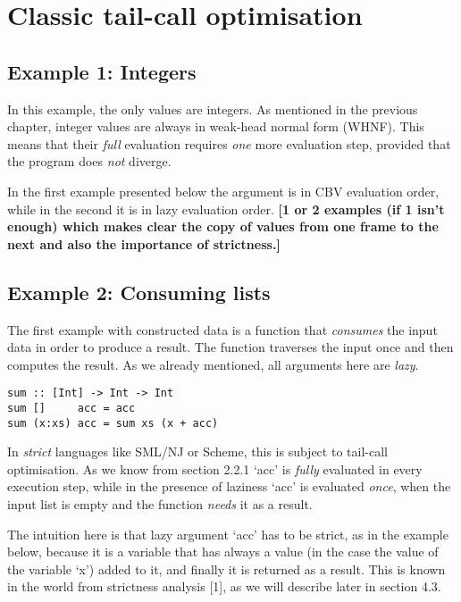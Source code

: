 \documentclass[diploma]{softlab-thesis}
\begin{document}
\section {Classic tail-call optimisation}

\subsection {Example 1: Integers}
In this example, the only values are integers. As mentioned 
in the previous chapter, integer values are always in weak-head normal 
form (WHNF). This means that their \textit{full} evaluation requires \textit{one} more evaluation
step, provided that the program does \textit{not} diverge. 


In the first example presented below the argument is in CBV evaluation order, 
while in the second it is in lazy evaluation order. \textbf{[1 or 2 examples (if 1 isn't enough) which makes clear the copy of values from 
one frame to the next and also the importance of strictness.]}


\subsection {Example 2: Consuming lists}

The first example with constructed data is a 
function that \textit{consumes} the input data in 
order to produce a result.  The function traverses 
the input once and then computes the result. As we 
already mentioned, all arguments here are \textit{lazy}.

\begin{verbatim}
sum :: [Int] -> Int -> Int
sum []     acc = acc
sum (x:xs) acc = sum xs (x + acc)
\end{verbatim}

In \textit{strict} languages like SML/NJ or Scheme,
this is subject to tail-call optimisation. As we know from section 2.2.1 
`acc' is \textit{fully} evaluated in every execution step, while in the
presence of laziness `acc' is evaluated \textit{once}, when the input 
list is empty and the function \textit{needs} it as a result.

The intuition here is that lazy argument `acc' has to be strict, as in the example below, 
because it is a variable that has always a value (in the case the value of the variable `x') added to it,
and finally it is returned as a result. This is known in the world from strictness analysis [1], as we 
will describe later in section 4.3.
\end{document}
